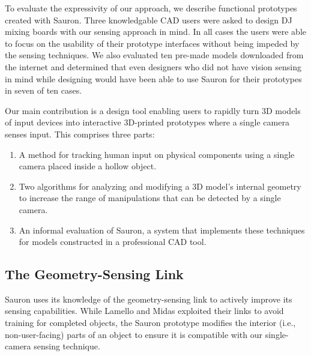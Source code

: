 To evaluate the expressivity of our approach, we describe functional prototypes created with Sauron. 
Three knowledgable CAD users were asked to %
design DJ mixing boards with our sensing approach in mind. In all cases the users were able to focus on the usability of their prototype interfaces without being impeded by the sensing techniques. We also evaluated ten pre-made models downloaded from the internet and determined that even designers who did not have vision sensing in mind while designing would have been able to use Sauron for their prototypes in seven of ten cases.

Our main contribution is a design tool enabling users to rapidly turn 3D models of input devices into interactive 3D-printed prototypes where a single camera senses input. This comprises three parts:

\begin{enumerate}
\item A method for tracking human input on physical components using a single camera placed inside a hollow object.
\item Two algorithms for analyzing and modifying a 3D model's internal geometry to increase the range of manipulations that can be detected by a single camera.
\item An informal evaluation of Sauron, a system that implements these techniques for models constructed in a professional CAD tool.
\end{enumerate}


    \subsection{The Geometry-Sensing Link}
    Sauron uses its knowledge of the geometry-sensing link to actively improve its sensing capabilities. While Lamello and Midas exploited their links to avoid training for completed objects, the Sauron prototype modifies the interior (i.e., non-user-facing) parts of an object to ensure it is compatible with our single-camera sensing technique.

